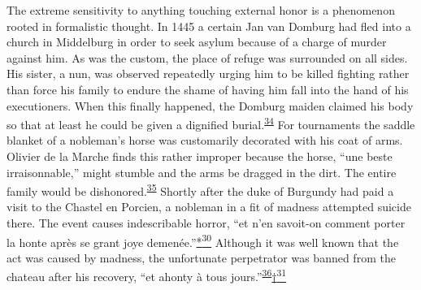 The extreme sensitivity to anything touching external honor is a
phenomenon rooted in formalistic thought. In 1445 a certain Jan van
Domburg had fled into a church in Middelburg in order to seek asylum
because of a charge of murder against him. As was the custom, the place
of refuge was surrounded on all sides. His sister, a nun, was observed
repeatedly urging him to be killed fighting rather than force his family
to endure the shame of having him fall into the hand of his
executioners. When this finally happened, the Domburg maiden claimed his
body so that at least he could be given a dignified
burial.\textsuperscript{\protect\hypertarget{18_Chapter_Eleven__THE_FORMS_OF_THO.xhtmlux5cux23id_565}{\protect\hyperlink{23_NOTES.xhtmlux5cux23id_566}{34}}}
For tournaments the saddle blanket of a nobleman's horse was customarily
decorated with his coat of arms. Olivier de la Marche finds this rather
improper because the horse, ``une beste irraisonnable,'' might stumble
and the arms be dragged in the dirt. The entire family would be
dishonored.\textsuperscript{\protect\hypertarget{18_Chapter_Eleven__THE_FORMS_OF_THO.xhtmlux5cux23id_563}{\protect\hyperlink{23_NOTES.xhtmlux5cux23id_564}{35}}}
Shortly after the duke of Burgundy had paid a visit to the Chastel en
Porcien, a nobleman in a fit of madness attempted suicide there. The
event causes indescribable horror, ``et n'en
savoit-\protect\hypertarget{18_Chapter_Eleven__THE_FORMS_OF_THO.xhtmlux5cux23page_280}{}{}on
comment porter la honte après se grant joye
demenée.''\protect\hypertarget{18_Chapter_Eleven__THE_FORMS_OF_THO.xhtmlux5cux23id_2623}{\protect\hyperlink{23_NOTES.xhtmlux5cux23id_2624}{*\textsuperscript{30}}}
Although it was well known that the act was caused by madness, the
unfortunate perpetrator was banned from the chateau after his recovery,
``et ahonty à tous
jours.''\textsuperscript{\protect\hypertarget{18_Chapter_Eleven__THE_FORMS_OF_THO.xhtmlux5cux23id_561}{\protect\hyperlink{23_NOTES.xhtmlux5cux23id_562}{36}}}\protect\hypertarget{18_Chapter_Eleven__THE_FORMS_OF_THO.xhtmlux5cux23id_2625}{\protect\hyperlink{23_NOTES.xhtmlux5cux23id_2626}{†\textsuperscript{31}}}

